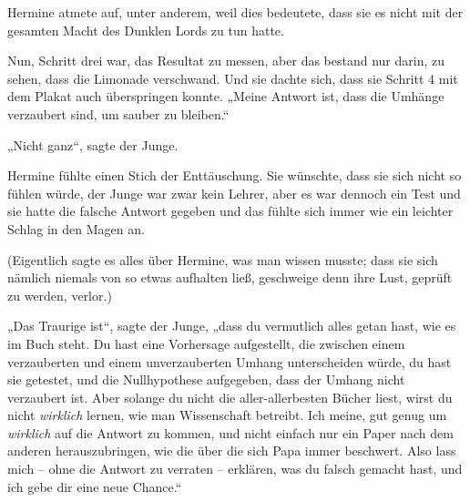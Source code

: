 Hermine atmete auf, unter anderem, weil dies bedeutete, dass sie es nicht mit der gesamten Macht des Dunklen Lords zu tun hatte.

Nun, Schritt drei war, das Resultat zu messen, aber das bestand nur darin, zu sehen, dass die Limonade verschwand. Und sie dachte sich, dass sie Schritt 4 mit dem Plakat auch überspringen konnte. „Meine Antwort ist, dass die Umhänge verzaubert sind, um sauber zu bleiben.“

„Nicht ganz“, sagte der Junge.

Hermine fühlte einen Stich der Enttäuschung. Sie wünschte, dass sie sich nicht so fühlen würde, der Junge war zwar kein Lehrer, aber es war dennoch ein Test und sie hatte die falsche Antwort gegeben und das fühlte sich immer wie ein leichter Schlag in den Magen an.

(Eigentlich sagte es alles über Hermine, was man wissen musste; dass sie sich nämlich niemals von so etwas aufhalten ließ, geschweige denn ihre Lust, geprüft zu werden, verlor.)

„Das Traurige ist“, sagte der Junge, „dass du vermutlich alles getan hast, wie es im Buch steht. Du hast eine Vorhersage aufgestellt, die zwischen einem verzauberten und einem unverzauberten Umhang unterscheiden würde, du hast sie getestet, und die Nullhypothese aufgegeben, dass der Umhang nicht verzaubert ist. Aber solange du nicht die aller-allerbesten Bücher liest, wirst du nicht \emph{wirklich} lernen, wie man Wissenschaft betreibt. Ich meine, gut genug um \emph{wirklich} auf die Antwort zu kommen, und nicht einfach nur ein Paper nach dem anderen herauszubringen, wie die über die sich Papa immer beschwert. Also lass mich – ohne die Antwort zu verraten – erklären, was du falsch gemacht hast, und ich gebe dir eine neue Chance.“

